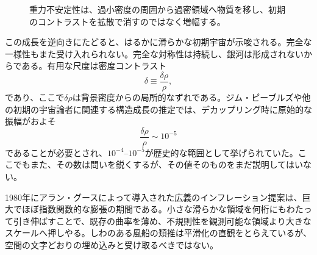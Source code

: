 \begin{figure}[htbp]
\centering
\begin{coursefitfigure}
\end{coursefitfigure}
\caption{重力不安定性は、過小密度の周囲から過密領域へ物質を移し、初期のコントラストを拡散で消すのではなく増幅する。}
\label{fig:c08-gravity-growth}
\end{figure}

この成長を逆向きにたどると、はるかに滑らかな初期宇宙が示唆される。完全な一様性もまた受け入れられない。完全な対称性は持続し、銀河は形成されないからである。有用な尺度は密度コントラスト
\begin{equation}
\delta\equiv\frac{\delta\rho}{\rho},
\end{equation}
であり、ここで\(\delta\rho\)は背景密度からの局所的なずれである。ジム・ピーブルズや他の初期の宇宙論者に関連する構造成長の推定では、デカップリング時に原始的な振幅がおよそ
\begin{equation}
\boxed{\frac{\delta\rho}{\rho}\sim10^{-5}}
\end{equation}
であることが必要とされ、\(10^{-4}\)--\(10^{-5}\)が歴史的な範囲として挙げられていた。ここでもまた、その数は問いを鋭くするが、その値そのものをまだ説明してはいない。

1980年にアラン・グースによって導入された広義のインフレーション提案は、巨大でほぼ指数関数的な膨張の期間である。小さな滑らかな領域を何桁にもわたって引き伸ばすことで、既存の曲率を薄め、不規則性を観測可能な領域より大きなスケールへ押しやる。しわのある風船の類推は平滑化の直観をとらえているが、空間の文字どおりの埋め込みと受け取るべきではない。

\begin{classroomqa}
\end{classroomqa}


